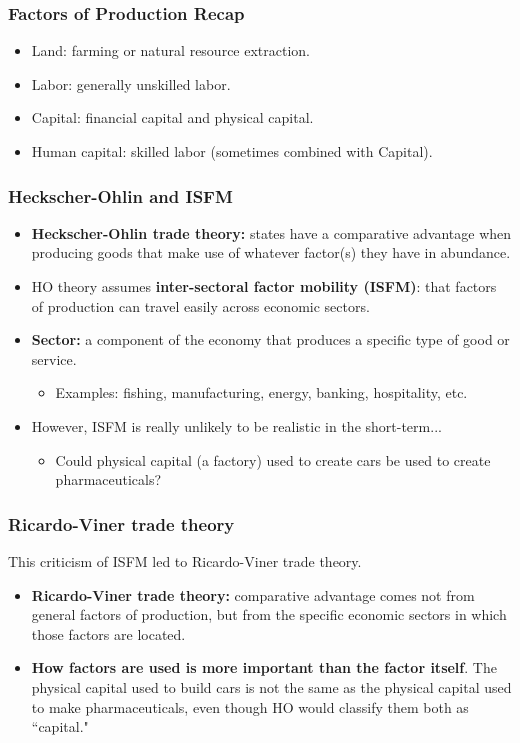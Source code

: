 \documentclass{beamer}
\begin{document}
\begin{frame} 
	\frametitle{\LARGE{Factors of Production Recap}}
	\begin{itemize}
			\item Land: farming or natural resource extraction. \pause
			\item Labor: generally unskilled labor. \pause
			\item Capital: financial capital and physical capital. \pause
			\item Human capital: skilled labor (sometimes combined with Capital).		
	\end{itemize}
\end{frame}

\begin{frame} 
	\frametitle{\LARGE{Heckscher-Ohlin and ISFM}}
	\begin{itemize}
		\item \textbf{Heckscher-Ohlin trade theory:} states have a comparative advantage when producing goods that make use of whatever factor(s) they have in abundance. \pause 
			\item HO theory assumes \textbf{inter-sectoral factor mobility (ISFM)}: that factors of production can travel easily across economic sectors. \pause
			\item \textbf{Sector:} a component of the economy that produces a specific type of good or service. \pause 
			\begin{itemize}
			    \item Examples: fishing, manufacturing, energy, banking, hospitality, etc. \pause
			\end{itemize}
			\item However, ISFM is really unlikely to be realistic in the short-term... \pause
			\begin{itemize}
			    \item Could physical capital (a factory) used to create cars be used to create pharmaceuticals?
			\end{itemize}		
	\end{itemize}
\end{frame}

\begin{frame} 
	\frametitle{\LARGE{Ricardo-Viner trade theory}}
This criticism of ISFM led to Ricardo-Viner trade theory. \pause
	\begin{itemize}
		\item \textbf{Ricardo-Viner trade theory:} comparative advantage comes not from general factors of production, but from the specific economic sectors in which those factors are located. \pause 
		\item \textbf{How factors are used is more important than the factor itself}. The physical capital used to build cars is not the same as the physical capital used to make pharmaceuticals, even though HO would classify them both as ``capital."
	\end{itemize}
\end{frame}
\end{document}
